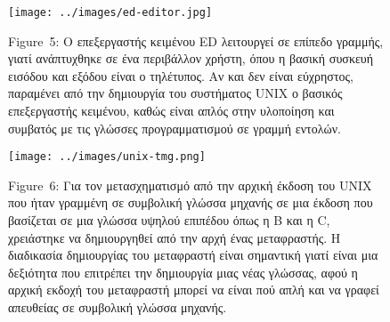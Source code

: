 \documentclass[
]{article}
\begin{document}
\leavevmode{}%
\begin{figure}
\hypertarget{fig:ed-editor}{%
\centering
\texttt{[image: ../images/ed-editor.jpg]}
\caption{Figure~5: Ο επεξεργαστής κειμένου ED λειτουργεί σε επίπεδο
γραμμής, γιατί ανάπτυχθηκε σε ένα περιβάλλον χρήστη, όπου η βασική
συσκευή εισόδου και εξόδου είναι ο τηλέτυπος. Αν και δεν είναι
εύχρηστος, παραμένει από την δημιουργία του συστήματος UNIX ο βασικός
επεξεργαστής κειμένου, καθώς είναι απλός στην υλοποίηση και συμβατός με
τις γλώσσες προγραμματισμού σε γραμμή εντολών.}\label{fig:ed-editor}
}
\end{figure}

\leavevmode{}%
\begin{figure}
\hypertarget{fig:unix-tmg}{%
\centering
\texttt{[image: ../images/unix-tmg.png]}
\caption{Figure~6: Για τον μετασχηματισμό από την αρχική έκδοση του UNIX
που ήταν γραμμένη σε συμβολική γλώσσα μηχανής σε μια έκδοση που
βασίζεται σε μια γλώσσα υψηλού επιπέδου όπως η B και η C, χρειάστηκε να
δημιουργηθεί από την αρχή ένας μεταφραστής. Η διαδικασία δημιουργίας του
μεταφραστή είναι σημαντική γιατί είναι μια δεξιότητα που επιτρέπει την
δημιουργία μιας νέας γλώσσας, αφού η αρχική εκδοχή του μεταφραστή μπορεί
να είναι πού απλή και να γραφεί απευθείας σε συμβολική γλώσσα
μηχανής.}\label{fig:unix-tmg}
}
\end{figure}
\end{document}
